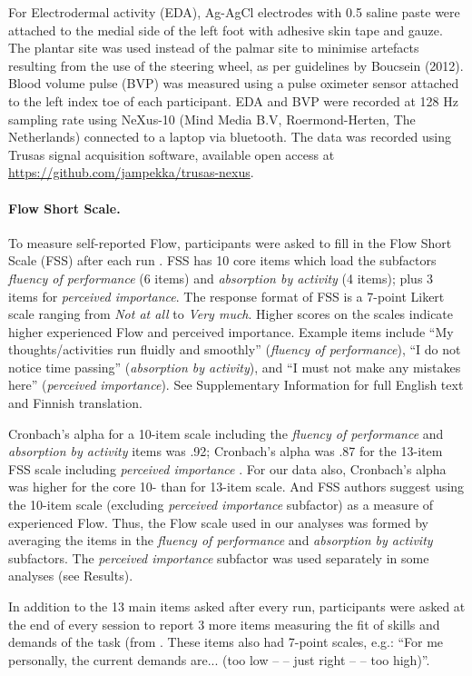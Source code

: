 \documentclass[fleqn,10pt]{wlscirep}
\begin{document}
For Electrodermal activity (EDA), Ag-AgCl electrodes with 0.5 saline paste were attached to the medial side of the left foot with adhesive skin tape and gauze. The plantar site was used instead of the palmar site to minimise artefacts resulting from the use of the steering wheel, as per guidelines by Boucsein (2012). Blood volume pulse (BVP) was measured using a pulse oximeter sensor attached to the left index toe of each participant. EDA and BVP were recorded at 128 Hz sampling rate using NeXus-10 (Mind Media B.V, Roermond-Herten, The Netherlands) connected to a laptop via bluetooth. The data was recorded using Trusas signal acquisition software, available open access at \url{https://github.com/jampekka/trusas-nexus}.


\paragraph{Flow Short Scale.} To measure self-reported Flow, participants were asked to fill in the Flow Short Scale (FSS) after each run \cite{Rheinberg2003,Engeser2008}. FSS has 10 core items which load the subfactors {\it fluency of performance} (6 items) and {\it absorption by activity} (4 items); plus 3 items for {\it perceived importance}. The response format of FSS is a 7-point Likert scale ranging from {\it Not at all} to {\it Very much}. Higher scores on the scales indicate higher experienced Flow and perceived importance. Example items include ``My thoughts/activities run fluidly and smoothly'' ({\it fluency of performance}), ``I do not notice time passing'' ({\it absorption by activity}), and ``I must not make any mistakes here'' ({\it perceived importance}). See Supplementary Information for full English text and Finnish translation.

Cronbach’s alpha for a 10-item scale including the {\it fluency of performance} and {\it absorption by activity} items was .92; Cronbach’s alpha was .87 for the 13-item FSS scale including {\it perceived importance} \cite{Rheinberg2003}. For our data also, Cronbach's alpha was higher for the core 10- than for 13-item scale. And FSS authors \cite{Rheinberg2003} suggest using the 10-item scale (excluding {\it perceived importance} subfactor) as a measure of experienced Flow. Thus, the Flow scale used in our analyses was formed by averaging the items in the {\it fluency of performance} and {\it absorption by activity} subfactors. The {\it perceived importance} subfactor was used separately in some analyses (see Results).

In addition to the 13 main items asked after every run, participants were asked at the end of every session to report 3 more items measuring the fit of skills and demands of the task (from  \cite{Rheinberg2003}. These items also had 7-point scales, e.g.: ``For me personally, the current demands are... (too low -- -- just right -- -- too high)''.
\end{document}
